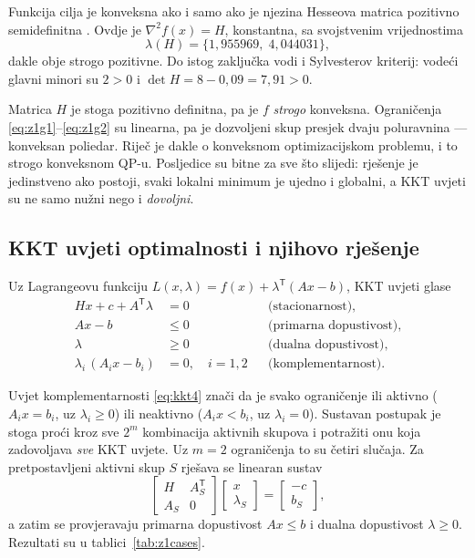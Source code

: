 Funkcija cilja je konveksna ako i samo ako je njezina Hesseova matrica pozitivno
semidefinitna \cite[str.~61]{jokic_konveksnost}. Ovdje je $\nabla^2 f(x) = H$,
konstantna, sa svojstvenim vrijednostima
\begin{equation}
  \lambda(H) = \{1{,}955969,\; 4{,}044031\},
\end{equation}
dakle obje strogo pozitivne. Do istog zaključka vodi i Sylvesterov kriterij:
vodeći glavni minori su $2 > 0$ i $\det H = 8 - 0{,}09 = 7{,}91 > 0$.

Matrica $H$ je stoga pozitivno definitna, pa je $f$ \emph{strogo} konveksna.
Ograničenja \eqref{eq:z1g1}--\eqref{eq:z1g2} su linearna, pa je dozvoljeni skup
presjek dvaju poluravnina --- konveksan poliedar. Riječ je dakle o konveksnom
optimizacijskom problemu, i to strogo konveksnom QP-u. Posljedice su bitne za
sve što slijedi: rješenje je jedinstveno ako postoji, svaki lokalni minimum je
ujedno i globalni, a KKT uvjeti su ne samo nužni nego i \emph{dovoljni}.

\subsection{KKT uvjeti optimalnosti i njihovo rješenje}
\label{sec:zad1:kkt}

Uz Lagrangeovu funkciju $L(x,\lambda) = f(x) + \lambda^{\mathsf T}(Ax-b)$,
KKT uvjeti \cite[str.~59]{jokic_kkt} glase
\begin{align}
  Hx + c + A^{\mathsf T}\lambda &= 0 && \text{(stacionarnost)}, \label{eq:kkt1}\\
  Ax - b &\le 0 && \text{(primarna dopustivost)}, \\
  \lambda &\ge 0 && \text{(dualna dopustivost)}, \\
  \lambda_i\,(A_ix - b_i) &= 0,\quad i=1,2 && \text{(komplementarnost)}. \label{eq:kkt4}
\end{align}

Uvjet komplementarnosti \eqref{eq:kkt4} znači da je svako ograničenje ili
aktivno ($A_ix = b_i$, uz $\lambda_i \ge 0$) ili neaktivno ($A_ix < b_i$, uz
$\lambda_i = 0$). Sustavan postupak je stoga proći kroz sve $2^m$ kombinacija
aktivnih skupova i potražiti onu koja zadovoljava \emph{sve} KKT uvjete. Uz
$m = 2$ ograničenja to su četiri slučaja. Za pretpostavljeni aktivni skup $S$
rješava se linearan sustav
\begin{equation}
  \begin{bmatrix} H & A_S^{\mathsf T} \\ A_S & 0 \end{bmatrix}
  \begin{bmatrix} x \\ \lambda_S \end{bmatrix}
  = \begin{bmatrix} -c \\ b_S \end{bmatrix},
  \label{eq:kktsys}
\end{equation}
a zatim se provjeravaju primarna dopustivost $Ax \le b$ i dualna dopustivost
$\lambda \ge 0$. Rezultati su u tablici~\ref{tab:z1cases}.

